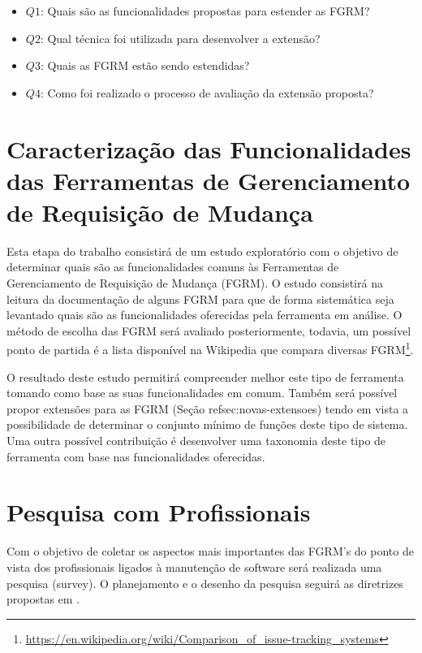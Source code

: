\documentclass[msc,proposal,hidelot,hideabstract]{ppgccufmg} %
\begin{document}
\begin{itemize}
  \item \textbf{$Q1$}: Quais são as funcionalidades propostas para estender as FGRM?
  \item \textbf{$Q2$}: Qual técnica foi utilizada para desenvolver a extensão?
  \item \textbf{$Q3$}: Quais as FGRM estão sendo estendidas?
  \item \textbf{$Q4$}: Como foi realizado o processo de avaliação da extensão proposta?
\end{itemize}


\section{Caracterização das Funcionalidades das Ferramentas de Gerenciamento de Requisição de Mudança}
\label{sec:caracterizacao}

Esta etapa do trabalho consistirá de um estudo exploratório com o objetivo de determinar quais são as funcionalidades comuns às Ferramentas de Gerenciamento de Requisição de Mudança (FGRM). O estudo consistirá na leitura da documentação de alguns FGRM para que de forma sistemática seja levantado quais são as funcionalidades oferecidas pela ferramenta em análise. O método de escolha das FGRM será avaliado posteriormente, todavia, um possível ponto de partida é a lista disponível na Wikipedia que compara diversas FGRM\footnote{\url{https://en.wikipedia.org/wiki/Comparison_of_issue-tracking_systems}}.

O resultado deste estudo permitirá compreender melhor este tipo de ferramenta tomando como base as suas funcionalidades em comum. Também será possível propor extensões para as FGRM (Seção ref{sec:novas-extensoes}) tendo em vista a possibilidade de determinar o conjunto mínimo de funções deste tipo de sistema. Uma outra possível contribuição é desenvolver uma taxonomia deste tipo de ferramenta com base nas funcionalidades oferecidas.

\section{Pesquisa com Profissionais}
\label{sec:survey}
Com o objetivo de coletar os aspectos mais importantes das FGRM's do ponto de
vista dos profissionais ligados à manutenção de software será realizada uma
 pesquisa (survey). O planejamento e o desenho da pesquisa seguirá as diretrizes propostas em \cite{wohlin2012experimentation}.
\end{document}
